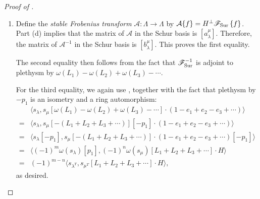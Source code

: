 \documentclass[11pt]{article}
\theoremstyle{definition}
\numberwithin{equation}{section}
\newcommand{\Fa}{\mathscr{F}}
\newcommand{\Sur}{\mathchoice{\operatorname{Sur}}{\operatorname{Sur}}{\mathrm{Sur}}{\mathrm{Sur}}}
\newcommand{\FSur}[1]{\mathscr{F}_{\Sur}\left\{#1\right\}}
\begin{document}
\begin{proof}[Proof of ]
\begin{enumerate}[label=(\alph*)]
\[        \]
        which is just $\langle f, s_\mu \cdot H \rangle$. Hence, \eqref{equation:limit} indeed holds. Substituting \eqref{equation:limit} into \eqref{equation:amulambda} with $f = \FSur{s_\lambda}$, we obtain \[a^\mu_\lambda = \langle \FSur{s_\lambda}, s_\mu \cdot H \rangle.\] The result now follows from the fact that $\Fa_{\Sur}$ is adjoint to plethysm by $H_+$.
        \item Define the \emph{stable Frobenius transform} $\mathcal{A} \colon \Lambda \to \Lambda$ by $\mathcal{A} \{f\} = H^\perp \FSur{f}$. Part (d) implies that the matrix of $\mathcal{A}$ in the Schur basis is $[a_\lambda^\mu]$. Therefore, the matrix of $\mathcal{A}^{-1}$ in the Schur basis is $[b_\lambda^\mu]$. This proves the first equality.
        
        The second equality then follows from the fact that $\Fa_{\Sur}^{-1}$ is adjoint to plethysm by $\omega(L_1) - \omega(L_2) + \omega(L_3) - \cdots$.
        
        For the third equality, we again use , together with the fact that plethysm by $-p_1$ is an isometry and a ring automorphism:
        \begin{align*}
            &\langle s_\lambda, s_\mu[\omega(L_1) - \omega(L_2) + \omega(L_3) - \cdots] \cdot (1 - e_1 + e_2 - e_3 + \cdots)\rangle \\
            =& \langle s_\lambda, s_\mu[-(L_1 + L_2 + L_3 + \cdots)][-p_1] \cdot (1 - e_1 + e_2 - e_3 + \cdots)\rangle \\
            =& \langle s_\lambda[-p_1], s_\mu[-(L_1 + L_2 + L_3 + \cdots)] \cdot (1 - e_1 + e_2 - e_3 + \cdots)[-p_1]\rangle \\
            =& \langle (-1)^m \omega(s_\lambda)[p_1], (-1)^n \omega(s_\mu)[L_1 + L_2 + L_3 + \cdots] \cdot H\rangle \\
            =& (-1)^{m - n} \langle s_{\lambda^T}, s_{\mu^T}[L_1 + L_2 + L_3 + \cdots] \cdot H\rangle,
        \end{align*}
        as desired. \qedhere
    \end{enumerate}
\end{proof}
\end{document}
